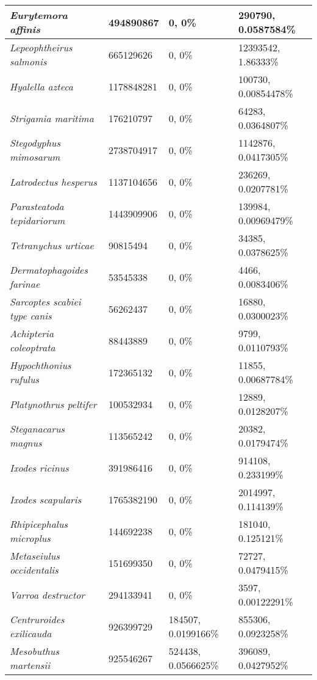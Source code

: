 {\begin{longtable}{| L{4cm} | L{2.7cm}  | L{3.7cm} | L{3.7cm} |}
\textit{Eurytemora affinis} & 494890867 & 0, 0\% & 290790, 0.0587584\% \\ \hline
\textit{Lepeophtheirus salmonis} & 665129626 & 0, 0\% & 12393542, 1.86333\% \\ \hline
\textit{Hyalella azteca} & 1178848281 & 0, 0\% & 100730, 0.00854478\% \\ \hline
\textit{Strigamia maritima} & 176210797 & 0, 0\% & 64283, 0.0364807\% \\ \hline
\textit{Stegodyphus mimosarum} & 2738704917 & 0, 0\% & 1142876, 0.0417305\% \\ \hline
\textit{Latrodectus hesperus} & 1137104656 & 0, 0\% & 236269, 0.0207781\% \\ \hline
\textit{Parasteatoda tepidariorum} & 1443909906 & 0, 0\% & 139984, 0.00969479\% \\ \hline
\textit{Tetranychus urticae} & 90815494 & 0, 0\% & 34385, 0.0378625\% \\ \hline
\textit{Dermatophagoides farinae} & 53545338 & 0, 0\% & 4466, 0.0083406\% \\ \hline
\textit{Sarcoptes scabiei type canis} & 56262437 & 0, 0\% & 16880, 0.0300023\% \\ \hline
\textit{Achipteria coleoptrata} & 88443889 & 0, 0\% & 9799, 0.0110793\% \\ \hline
\textit{Hypochthonius rufulus} & 172365132 & 0, 0\% & 11855, 0.00687784\% \\ \hline
\textit{Platynothrus peltifer} & 100532934 & 0, 0\% & 12889, 0.0128207\% \\ \hline
\textit{Steganacarus magnus} & 113565242 & 0, 0\% & 20382, 0.0179474\% \\ \hline
\textit{Ixodes ricinus} & 391986416 & 0, 0\% & 914108, 0.233199\% \\ \hline
\textit{Ixodes scapularis} & 1765382190 & 0, 0\% & 2014997, 0.114139\% \\ \hline
\textit{Rhipicephalus microplus} & 144692238 & 0, 0\% & 181040, 0.125121\% \\ \hline
\textit{Metaseiulus occidentalis} & 151699350 & 0, 0\% & 72727, 0.0479415\% \\ \hline
\textit{Varroa destructor} & 294133941 & 0, 0\% & 3597, 0.00122291\% \\ \hline
\textit{Centruroides exilicauda} & 926399729 & 184507, 0.0199166\% & 855306, 0.0923258\% \\ \hline
\textit{Mesobuthus martensii} & 925546267 & 524438, 0.0566625\% & 396089, 0.0427952\% \\ \hline

\end{longtable}}
